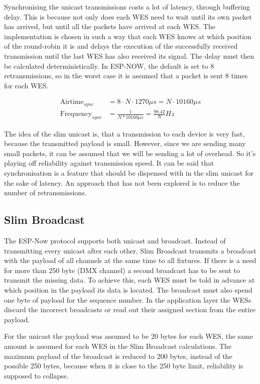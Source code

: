 Synchronising the unicast transmissions costs a lot of 
latency, through buffering delay.
This is because not only does each WES need to wait until its own packet has arrived,
but until all the packets have arrived at each WES.
The implementation is chosen in such a way that each WES knows at which position of the round-robin it is
and delays the execution of the successfully received transmission until the last WES has also received its signal.
The delay must then be calculated deterministically.
In ESP-NOW, the default is set to 8 retransmissions, so in the worst case it is assumed that a packet is sent 8 times
for each WES.

\begin{align} 
	\text{Airtime}_{sync} &= 8 \cdot N \cdot 1270\mu s = N \cdot 10160\mu s \\
	\text{Frequency}_{sync} &= \frac{1}{N * 10160\mu s} = \frac{98.42}{N} Hz
\end{align} 

The idea of the slim unicast is, that a transmission to each device is very fast, because the transmitted payload is small.
However, since we are sending many small packets, it can be assumed that we will be sending a lot of overhead.
So it's playing off reliability against transmission speed.
It can be said that synchronisation is a feature that should be dispensed with in the slim unicast for the sake of latency.
An approach that has not been explored is to reduce the number of retransmissions.

\subsection*{Slim Broadcast}

The ESP-Now protocol supports both unicast and broadcast.
Instead of transmitting every unicast after each other, 
Slim Broadcast transmits a broadcast with the payload of all channels at the same time to all fixtures.
If there is a need for more than 250 byte (DMX channel) a second broadcast has to be sent 
to transmit the missing data.
To achieve this, each WES must be told in advance at which position in the payload its data is located.
The broadcast must also spend one byte of payload for the sequence number.
In the application layer the WESs discard the incorrect broadcasts or read out their assigned section
from the entire payload.

For the unicast the payload was assumed to be 20 bytes for each WES, the same amount is assumed for each WES in the Slim Broadcast calculations.
The maximum payload of the broadcast is reduced to 200 bytes, instead of the possible 250 bytes, 
because when it is close to the 250 byte limit, reliability is supposed to collapse.

